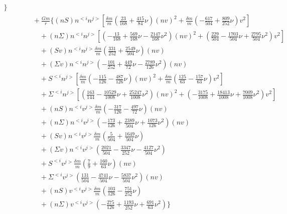 {\begin{eqnarray}
\bigg\}\nonumber \\
 &&\qquad+\frac{Gm}{r}\bigg\{
 (nS) n^{<i} n^{j>}\left[\frac{\delta m}{m}\left(\frac{23}{168} + \frac{415}{84} \nu\right) (nv)^2+\frac{\delta m}{m}\left(-\frac{617}{504} + \frac{809}{252} \nu\right) v^{2}\right] \nonumber \\ 
&&\qquad\quad+ (n\Sigma ) n^{<i} n^{j>}\left[\left(-\frac{13}{168} + \frac{569}{168} \nu -\frac{2147}{168} \nu^2\right) (nv)^2+\left(\frac{229}{504} -\frac{1703}{504} \nu + \frac{2795}{504} \nu^2\right) v^{2}\right] \nonumber \\ 
&&\qquad\quad + (Sv) n^{<i} n^{j>}\frac{\delta m}{m}\left(\frac{331}{252} + \frac{2549}{504} \nu\right) (nv) \nonumber \\ 
&&\qquad\quad + (\Sigma v) n^{<i} n^{j>}\left(-\frac{101}{252} + \frac{449}{72} \nu -\frac{2789}{126} \nu^2\right) (nv) \nonumber \\ 
&&\qquad\quad + S^{<i} n^{j>}\left[\frac{\delta m}{m}\left(-\frac{115}{126} -\frac{487}{126} \nu\right) (nv)^2+\frac{\delta m}{m}\left(\frac{125}{63} -\frac{157}{63} \nu\right) v^{2}\right] \nonumber \\ 
&&\qquad\quad + \Sigma^{<i} n^{j>}\left[\left(\frac{163}{144} -\frac{10529}{1008} \nu + \frac{25247}{1008} \nu^2\right) (nv)^2+\left(-\frac{3175}{1008} + \frac{18413}{1008} \nu + \frac{7009}{1008} \nu^2\right) v^{2}\right] \nonumber \\ 
&&\qquad\quad + (nS) n^{<i} v^{j>}\frac{\delta m}{m}\left(-\frac{317}{126} -\frac{497}{72} \nu\right) (nv) \nonumber \\ 
&&\qquad\quad + (n\Sigma ) n^{<i} v^{j>}\left(-\frac{173}{126} + \frac{2389}{504} \nu + \frac{1073}{126} \nu^2\right) (nv) \nonumber \\ 
&&\qquad\quad + (Sv) n^{<i} v^{j>}\frac{\delta m}{m}\left(\frac{5}{504} + \frac{1649}{504} \nu\right) \nonumber \\ 
&&\qquad\quad + (\Sigma v) n^{<i} v^{j>}\left(\frac{2021}{504} -\frac{3347}{252} \nu -\frac{4127}{504} \nu^2\right) \nonumber \\ 
&&\qquad\quad + S^{<i} v^{j>}\frac{\delta m}{m}\left(\frac{7}{9} + \frac{160}{63} \nu\right) (nv) \nonumber \\ 
&&\qquad\quad + \Sigma^{<i} v^{j>}\left(\frac{131}{504} -\frac{4741}{504} \nu -\frac{5837}{504} \nu^2\right) (nv) \nonumber \\ 
&&\qquad\quad + (nS) v^{<i} v^{j>}\frac{\delta m}{m}\left(\frac{103}{126} -\frac{751}{252} \nu\right) \nonumber \\ 
&&\qquad\quad + (n\Sigma ) v^{<i} v^{j>}\left(-\frac{275}{126} + \frac{1193}{252} \nu + \frac{691}{63} \nu^2\right)\bigg\}\nonumber \\

\end{eqnarray}}
